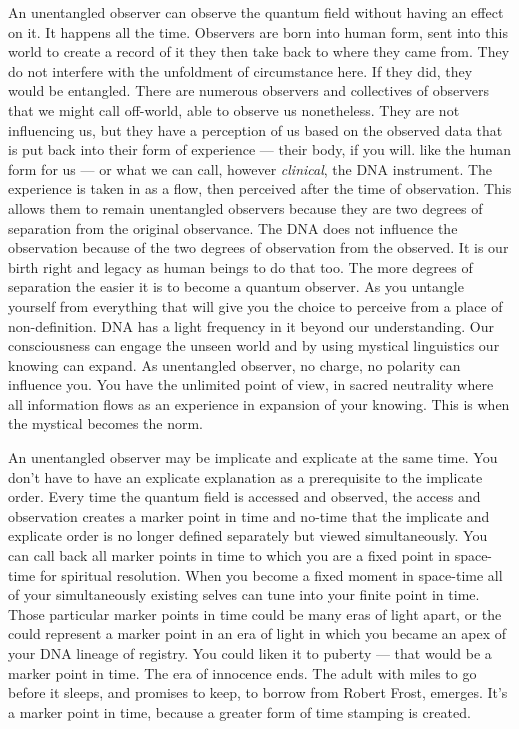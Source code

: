 An unentangled observer can observe the quantum field without having an
effect on it. It happens all the time. Observers are born into human
form, sent into this world to create a record of it they then take back
to where they came from. They do not interfere with the unfoldment of
circumstance here. If they did, they would be entangled. There are
numerous observers and collectives of observers that we might call
off-world, able to observe us nonetheless. They are not influencing us,
but they have a perception of us based on the observed data that is put
back into their form of experience --- their body, if you will. like the
human form for us --- or what we can call, however \emph{clinical}, the
DNA instrument. The experience is taken in as a flow, then perceived
after the time of observation. This allows them to remain unentangled
observers because they are two degrees of separation from the original
observance. The DNA does not influence the observation because of the
two degrees of observation from the observed. It is our birth right and
legacy as human beings to do that too. The more degrees of separation
the easier it is to become a quantum observer. As you untangle yourself
from everything that will give you the choice to perceive from a place
of non-definition. DNA has a light frequency in it beyond our
understanding. Our consciousness can engage the unseen world and by
using mystical linguistics our knowing can expand. As unentangled
observer, no charge, no polarity can influence you. You have the
unlimited point of view, in sacred neutrality where all information
flows as an experience in expansion of your knowing. This is when the
mystical becomes the norm.

An unentangled observer may be implicate and explicate at the same time.
You don't have to have an explicate explanation as a prerequisite to the
implicate order. Every time the quantum field is accessed and observed,
the access and observation creates a marker point in time and no-time
that the implicate and explicate order is no longer defined separately
but viewed simultaneously. You can call back all marker points in time
to which you are a fixed point in space-time for spiritual resolution.
When you become a fixed moment in space-time all of your simultaneously
existing selves can tune into your finite point in time. Those
particular marker points in time could be many eras of light apart, or
the could represent a marker point in an era of light in which you
became an apex of your DNA lineage of registry. You could liken it to
puberty --- that would be a marker point in time. The era of innocence
ends. The adult with miles to go before it sleeps, and promises to keep,
to borrow from Robert Frost, emerges. It's a marker point in time,
because a greater form of time stamping is created.

